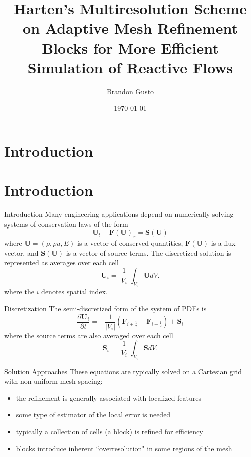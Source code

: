 \documentclass{beamer}
\begin{document}
\section{Introduction}
\title{Harten's Multiresolution Scheme on Adaptive Mesh Refinement Blocks for More Efficient Simulation of Reactive Flows}
\author{Brandon Gusto} %
\date{\today}
\frame{\titlepage}

\section{Introduction}

\begin{frame}{Introduction}
    Many engineering applications depend on numerically solving systems of conservation laws of the form
    \begin{equation*}
        \mathbf{U}_{t} + \mathbf{F}(\mathbf{U})_{x} = \mathbf{S}(\mathbf{U})
    \end{equation*}
    where $\mathbf{U} = (\rho,\rho u,E)$ is a vector of conserved quantities,
    $\mathbf{F}(\mathbf{U})$ is a flux vector, and $\mathbf{S}(\mathbf{U})$ is a
    vector of source terms. The discretized solution is represented as
    averages over each cell
    \begin{equation*}
        \mathbf{U}_{i} = \frac{1}{|V_{i}|} \int_{V_{i}} \mathbf{U} dV.
    \end{equation*}
    where the $i$ denotes spatial index.
\end{frame}

\begin{frame}{Discretization}
    The semi-discretized form of the system of PDEs is
    \begin{equation*}
        \frac{\partial \mathbf{U}_{i}}{\partial t} = -\frac{1}{|V_{i}|} \left( \mathbf{F}_{i+\frac{1}{2}}
            - \mathbf{F}_{i-\frac{1}{2}} \right) + \mathbf{S}_{i}
    \end{equation*}
    where the source terms are also averaged over each cell
    \begin{equation*}
        \mathbf{S}_{i} = \frac{1}{|V_{i}|} \int_{V_{i}} \mathbf{S} dV.
    \end{equation*}

\end{frame}

\begin{frame}{Solution Approaches}
    These equations are typically solved on a Cartesian grid with non-uniform mesh spacing:
    \begin{itemize}
        \item<2-> the refinement is generally associated with localized features
        \item<3-> some type of estimator of the local error is needed
        \item<4-> typically a collection of cells (a block) is refined for efficiency
        \item<5-> blocks introduce inherent ``overresolution" in some regions of the mesh
    \end{itemize}
\end{frame}
\end{document}
